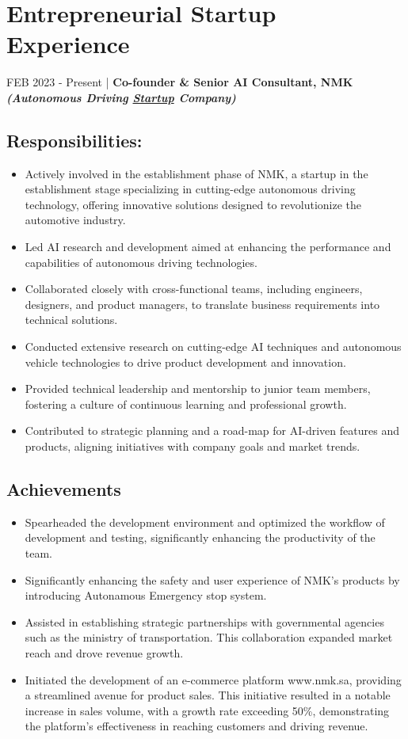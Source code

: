\documentclass[letterpaper,
		10pt]{article}
\begin{document}
\section{Entrepreneurial Startup Experience}
FEB 2023 - Present | \textbf{Co-founder \& Senior AI Consultant, NMK} \textit{\textbf{ (Autonomous Driving \underline{Startup} Company)}}
\subsection{Responsibilities:}
\begin{itemize}
\item Actively involved in the establishment phase of NMK, a startup in the establishment stage specializing in cutting-edge autonomous driving technology, offering innovative solutions designed to revolutionize the automotive industry. 
\item Led AI research and development aimed at enhancing the performance and capabilities of autonomous driving technologies.
\item Collaborated closely with cross-functional teams, including engineers, designers, and product managers, to translate business requirements into technical solutions.
\item Conducted extensive research on cutting-edge AI techniques and autonomous vehicle technologies to drive product development and innovation.
\item Provided technical leadership and mentorship to junior team members, fostering a culture of continuous learning and professional growth.
\item Contributed to strategic planning and a road-map for AI-driven features and products, aligning initiatives with company goals and market trends.     
\end{itemize}

\subsection{Achievements}
\begin{itemize}
\item Spearheaded the development environment and optimized the workflow of development and testing, significantly enhancing the productivity of the team.
\item Significantly enhancing the safety and user experience of NMK's products by introducing Autonamous Emergency stop system. 
\item Assisted in establishing strategic partnerships with governmental agencies such as the ministry of transportation. This collaboration expanded market reach and drove revenue growth.
\item Initiated the development of an e-commerce platform www.nmk.sa, providing a streamlined avenue for product sales. This initiative resulted in a notable increase in sales volume, with a growth rate exceeding 50\%, demonstrating the platform's effectiveness in reaching customers and driving revenue.
\end{itemize}
\end{document}
